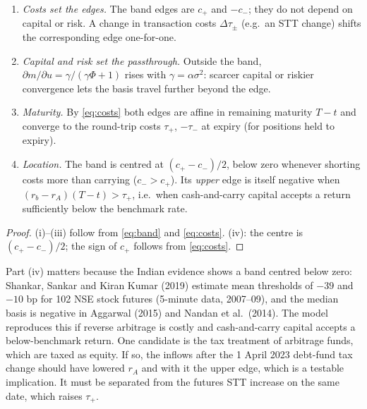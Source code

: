\begin{proposition}\label{prop:cs}
\begin{enumerate}[label=(\roman*),leftmargin=1.8em,itemsep=1pt]
\item \emph{Costs set the edges.} The band edges are $c_+$ and $-c_-$; they do not depend on capital or risk. A change in
transaction costs $\Delta\tau_\pm$ (e.g.\ an STT change) shifts the corresponding edge one-for-one.
\item \emph{Capital and risk set the passthrough.} Outside the band, $\partial m/\partial u=\gamma/(\gamma\Phi+1)$ rises with
$\gamma=\alpha\sigma^2$: scarcer capital or riskier convergence lets the basis travel further beyond the edge.
\item \emph{Maturity.} By \eqref{eq:costs} both edges are affine in remaining maturity $T-t$ and converge to the round-trip
costs $\tau_+$, $-\tau_-$ at expiry (for positions held to expiry).
\item \emph{Location.} The band is centred at $(c_+-c_-)/2$, below zero whenever shorting costs more than carrying
($c_->c_+$). Its \emph{upper} edge is itself negative when $(r_b-r_A)(T-t)>\tau_+$, i.e.\ when cash-and-carry capital
accepts a return sufficiently below the benchmark rate.
\end{enumerate}
\end{proposition}
\begin{proof}
(i)--(iii) follow from \eqref{eq:band} and \eqref{eq:costs}. (iv): the centre is $(c_+-c_-)/2$; the sign of $c_+$
follows from \eqref{eq:costs}.
\end{proof}

\begin{remark}
Part (iv) matters because the Indian evidence shows a band centred below zero: Shankar, Sankar and Kiran Kumar (2019)
estimate mean thresholds of $-39$ and $-10$ bp for 102 NSE stock futures (5-minute data, 2007--09), and the median basis
is negative in Aggarwal (2015) and Nandan et al.\ (2014). The model reproduces this if reverse arbitrage is costly and
cash-and-carry capital accepts a below-benchmark return. One candidate is the tax treatment of arbitrage funds, which
are taxed as equity. If so, the inflows after the 1 April 2023 debt-fund tax change should have lowered $r_A$ and with it
the upper edge, which is a testable implication. It must be separated from the futures STT increase on the same date, which
raises $\tau_+$.
\end{remark}

